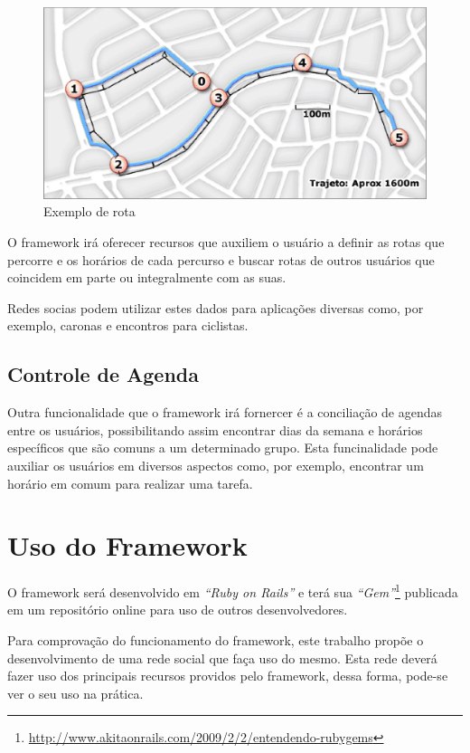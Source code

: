 \begin{figure}[!h]
	\centering
	\includegraphics[scale=0.55]{figuras/capitulo5/rota.eps}
	\caption{Exemplo de rota}
	\label{rota}
\end{figure}

O framework irá oferecer recursos que auxiliem o usuário a definir as rotas que percorre e os horários de cada percurso e buscar rotas de outros usuários que coincidem em parte ou integralmente com as suas.

Redes socias podem utilizar estes dados para aplicações diversas como, por exemplo, caronas e encontros para ciclistas.

\subsection{Controle de Agenda}

Outra funcionalidade que o framework irá fornercer é a conciliação de agendas entre os usuários, possibilitando assim encontrar dias da semana e horários específicos que são comuns a um determinado grupo. Esta funcinalidade pode auxiliar os usuários em diversos aspectos como, por exemplo, encontrar um horário em comum para realizar uma tarefa.

\section{Uso do Framework}

O framework será desenvolvido em \textit{``Ruby on Rails''} e terá sua \textit{``Gem''}\footnote{\url{http://www.akitaonrails.com/2009/2/2/entendendo-rubygems}} publicada em um repositório online para uso de outros desenvolvedores.

Para comprovação do funcionamento do framework, este trabalho propõe o desenvolvimento de uma rede social que faça uso do mesmo. Esta rede deverá fazer uso dos principais recursos providos pelo framework, dessa forma, pode-se ver o seu uso na prática.

